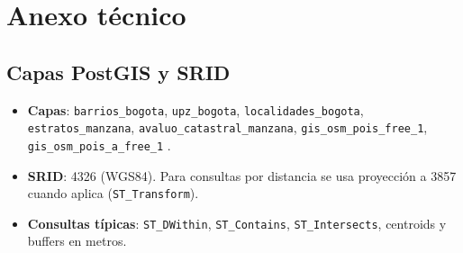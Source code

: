 


\section{Anexo técnico}

\subsection{Capas PostGIS y SRID}
\begin{itemize}
    \item \textbf{Capas}: \texttt{barrios\_bogota}, \texttt{upz\_bogota}, \texttt{localidades\_bogota}, \texttt{estratos\_manzana}, \texttt{avaluo\_catastral\_manzana}, \texttt{gis\_osm\_pois\_free\_1}, \texttt{gis\_osm\_pois\_a\_free\_1} \cite{datosabiertos_bogota}.
    \item \textbf{SRID}: 4326 (WGS84). Para consultas por distancia se usa proyección a 3857 cuando aplica (\texttt{ST\_Transform}).
    \item \textbf{Consultas típicas}: \texttt{ST\_DWithin}, \texttt{ST\_Contains}, \texttt{ST\_Intersects}, centroids y buffers en metros.
\end{itemize}

